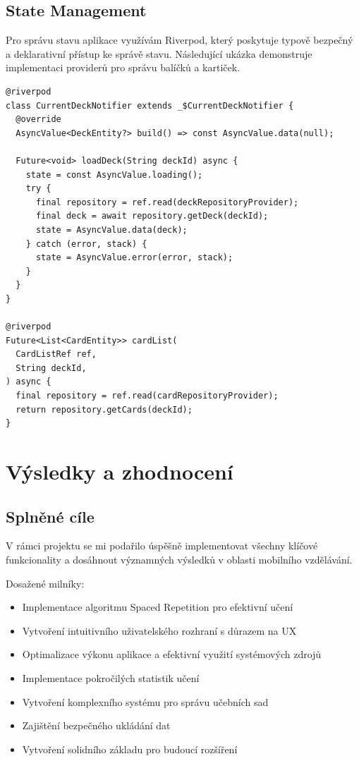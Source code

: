 \documentclass[12pt, a4paper, oneside]{report}
\begin{document}
	\section{State Management}
	Pro správu stavu aplikace využívám Riverpod, který poskytuje typově bezpečný a deklarativní přístup ke správě stavu. Následující ukázka demonstruje implementaci providerů pro správu balíčků a kartiček.

	\begin{lstlisting}[style=Python, caption=Implementace Riverpod providerů]
@riverpod
class CurrentDeckNotifier extends _$CurrentDeckNotifier {
  @override
  AsyncValue<DeckEntity?> build() => const AsyncValue.data(null);

  Future<void> loadDeck(String deckId) async {
    state = const AsyncValue.loading();
    try {
      final repository = ref.read(deckRepositoryProvider);
      final deck = await repository.getDeck(deckId);
      state = AsyncValue.data(deck);
    } catch (error, stack) {
      state = AsyncValue.error(error, stack);
    }
  }
}

@riverpod
Future<List<CardEntity>> cardList(
  CardListRef ref,
  String deckId,
) async {
  final repository = ref.read(cardRepositoryProvider);
  return repository.getCards(deckId);
}
	\end{lstlisting}

\chapter{Výsledky a zhodnocení}
	\section{Splněné cíle}
	V rámci projektu se mi podařilo úspěšně implementovat všechny klíčové funkcionality a dosáhnout významných výsledků v oblasti mobilního vzdělávání.

	Dosažené milníky:
	\begin{itemize}
		\item Implementace algoritmu Spaced Repetition pro efektivní učení
		\item Vytvoření intuitivního uživatelského rozhraní s důrazem na UX
		\item Optimalizace výkonu aplikace a efektivní využití systémových zdrojů
		\item Implementace pokročilých statistik učení
		\item Vytvoření komplexního systému pro správu učebních sad
		\item Zajištění bezpečného ukládání dat
		\item Vytvoření solidního základu pro budoucí rozšíření
	\end{itemize}
\end{document}
